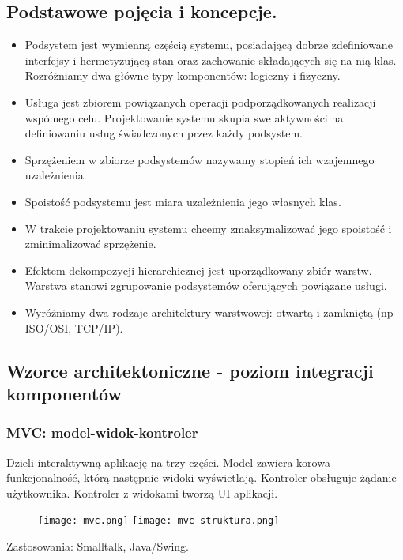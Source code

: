 \documentclass[a4paper]{article}
\begin{document}
\subsection{Podstawowe pojęcia i koncepcje.}
\begin{itemize}
    \item Podsystem jest wymienną częścią systemu,
posiadającą dobrze zdefiniowane interfejsy i
hermetyzującą stan oraz zachowanie
składających się na nią klas. Rozróżniamy dwa główne typy komponentów:
logiczny i fizyczny.
    \item Usługa jest zbiorem powiązanych operacji
podporządkowanych realizacji wspólnego
celu. Projektowanie systemu skupia swe aktywności
na definiowaniu usług świadczonych przez
każdy podsystem.
    \item Sprzężeniem w zbiorze podsystemów nazywamy
stopień ich wzajemnego uzależnienia.
    \item Spoistość podsystemu jest miara uzależnienia jego
własnych klas.
    \item W trakcie projektowaniu systemu chcemy
zmaksymalizować jego spoistość i
zminimalizować sprzężenie.
    \item Efektem dekompozycji hierarchicznej jest
uporządkowany zbiór warstw. Warstwa stanowi
zgrupowanie podsystemów oferujących
powiązane usługi.
    \item Wyróżniamy dwa rodzaje architektury warstwowej:
otwartą i zamkniętą (np ISO/OSI, TCP/IP).
\end{itemize}


\subsection{Wzorce architektoniczne - poziom integracji komponentów}

\subsubsection{MVC: model-widok-kontroler}
Dzieli interaktywną aplikację na trzy części. Model zawiera korowa
funkcjonalność, którą następnie widoki wyświetlają. Kontroler obsługuje
żądanie użytkownika. Kontroler z widokami tworzą UI aplikacji.

    \begin{figure}[h]
        \texttt{[image: mvc.png]}
        \texttt{[image: mvc-struktura.png]}
    \end{figure}

Zastosowania: Smalltalk, Java/Swing.
\end{document}
